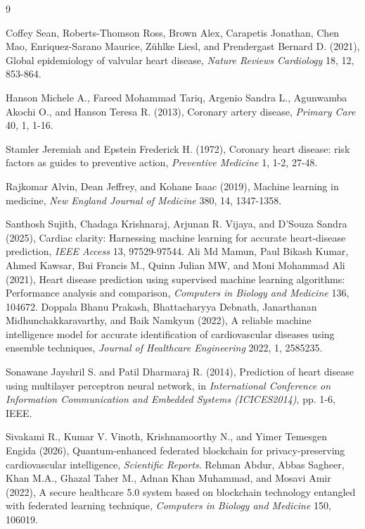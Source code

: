 \documentclass[twoside]{article}
\begin{document}
\begin{thebibliography}{9}

Coffey Sean, Roberts-Thomson Ross, Brown Alex, Carapetis Jonathan, Chen Mao, Enriquez-Sarano Maurice, Z\"{u}hlke Liesl, and Prendergast Bernard D. (2021), Global epidemiology of valvular heart disease, {\it Nature Reviews Cardiology} 18, 12, 853-864.

Hanson Michele A., Fareed Mohammad Tariq, Argenio Sandra L., Agunwamba Akochi O., and Hanson Teresa R. (2013), Coronary artery disease, {\it Primary Care} 40, 1, 1-16.

Stamler Jeremiah and Epstein Frederick H. (1972), Coronary heart disease: risk factors as guides to preventive action, {\it Preventive Medicine} 1, 1-2, 27-48.


Rajkomar Alvin, Dean Jeffrey, and Kohane Isaac (2019), Machine learning in medicine, {\it New England Journal of Medicine} 380, 14, 1347-1358.


Santhosh Sujith, Chadaga Krishnaraj, Arjunan R. Vijaya, and D'Souza Sandra (2025), Cardiac clarity: Harnessing machine learning for accurate heart-disease prediction, {\it IEEE Access} 13, 97529-97544.
Ali Md Mamun, Paul Bikash Kumar, Ahmed Kawsar, Bui Francis M., Quinn Julian MW, and Moni Mohammad Ali (2021), Heart disease prediction using supervised machine learning algorithms: Performance analysis and comparison, {\it Computers in Biology and Medicine} 136, 104672.
Doppala Bhanu Prakash, Bhattacharyya Debnath, Janarthanan Midhunchakkaravarthy, and Baik Namkyun (2022), A reliable machine intelligence model for accurate identification of cardiovascular diseases using ensemble techniques, {\it Journal of Healthcare Engineering} 2022, 1, 2585235.

Sonawane Jayshril S. and Patil Dharmaraj R. (2014), Prediction of heart disease using multilayer perceptron neural network, in {\it International Conference on Information Communication and Embedded Systems (ICICES2014)}, pp. 1-6, IEEE.

Sivakami R., Kumar V. Vinoth, Krishnamoorthy N., and Yimer Temesgen Engida (2026), Quantum-enhanced federated blockchain for privacy-preserving cardiovascular intelligence, {\it Scientific Reports}.
Rehman Abdur, Abbas Sagheer, Khan M.A., Ghazal Taher M., Adnan Khan Muhammad, and Mosavi Amir (2022), A secure healthcare 5.0 system based on blockchain technology entangled with federated learning technique, {\it Computers in Biology and Medicine} 150, 106019.



\end{thebibliography}
\end{document}
